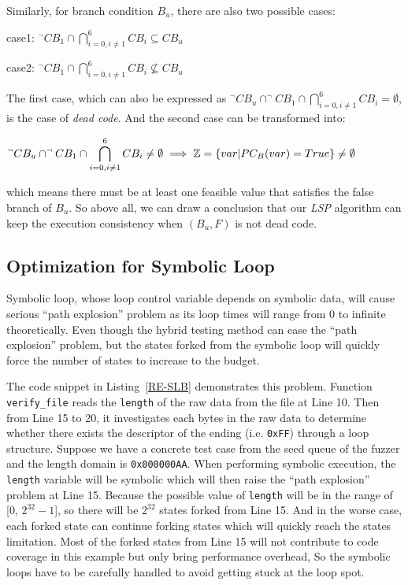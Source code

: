 Similarly, for branch condition $B_u$, there are also two possible cases:
\begin{center}
case1: $\displaystyle ^\neg CB_1 \cap \bigcap\limits_{i=0,i\neq 1}^6 CB_i \subseteq CB_u$

case2: $\displaystyle ^\neg CB_1 \cap \bigcap\limits_{i=0,i\neq 1}^6 CB_i \nsubseteq CB_u$
\end{center}

The first case, which can also be expressed as $^\neg CB_u \cap ^\neg CB_1 \cap \bigcap_{i=0,i\neq 1}^6 CB_i = \emptyset$, is the case of \emph{dead code}. And the second case can be transformed into:
\begin{center}
$\displaystyle ^\neg CB_u \cap ^\neg CB_1 \cap \bigcap\limits_{i=0,i\neq 1}^6 CB_i \neq \emptyset \implies \mathbb{Z} = \{var\arrowvert PC_B(var) = True\} \neq \emptyset$
\end{center}

\noindent which means there must be at least one feasible value that satisfies the false branch of $B_u$. So above all, we can draw a conclusion that our \emph{LSP} algorithm can keep the execution consistency when $(B_u, F)$ is not dead code.

\subsection{Optimization for Symbolic Loop}
Symbolic loop, whose loop control variable depends on symbolic data, will cause serious ``path explosion'' problem as its loop times will range from 0 to infinite theoretically. 
Even though the hybrid testing method can ease the ``path explosion'' problem, but the states forked from the symbolic loop will quickly force the number of states to increase to the budget. 

 

The code snippet in Listing~\ref{RE-SLB} demonstrates this problem. Function \texttt{verify\_file} reads the \texttt{length} of the raw data from the file at Line 10. Then from Line 15 to 20, it investigates each bytes in the raw data to determine whether there exists the descriptor of the ending (i.e. \texttt{0xFF}) through a loop structure. Suppose we have a concrete test case from the seed queue of the fuzzer and the length domain is \texttt{0x000000AA}. 
When performing symbolic execution, the \texttt{length} variable will be symbolic which will then raise the ``path explosion'' problem at Line 15. Because the possible value of \texttt{length} will be in the range of [0, $2^{32}-1$], so there will be $2^{32}$ states forked from Line 15. And in the worse case, each forked state can continue forking states which will quickly reach the states limitation. 
Most of the forked states from Line 15 will not contribute to code coverage in this example but only bring performance overhead, So the symbolic loops have to be carefully handled to avoid getting stuck at the loop spot. 


